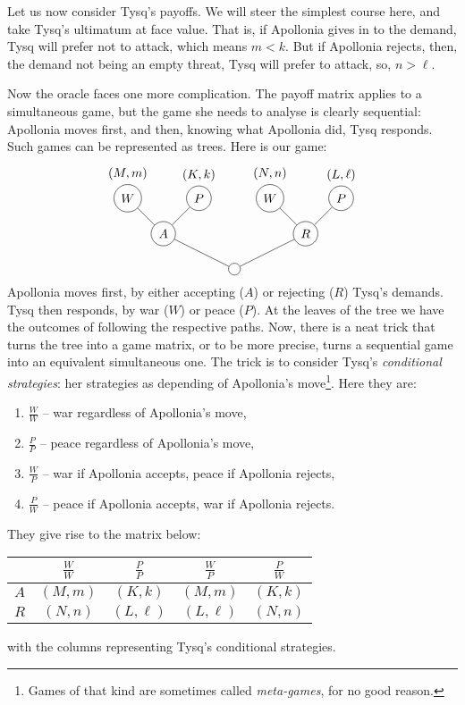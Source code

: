 \documentclass{amsart}
\begin{document}
Let us now consider Tysq's payoffs. We will steer the simplest course
here, and take Tysq's ultimatum at face value. That is, if Apollonia gives in to
the demand, Tysq will prefer not to attack, which means $m < k$. 
But if Apollonia rejects, then, the demand not being an empty threat, 
Tysq will prefer to attack, so, $n>\ell$. 

\bigskip
Now the oracle faces one more complication. The payoff matrix applies 
to a simultaneous game, but the game she needs to analyse is clearly sequential:
Apollonia moves first, and then, knowing what Apollonia did, Tysq responds. Such games
can be represented as trees. Here is our game:
$$
\begin{tikzpicture}
\path node (v0) at (0,0) [circle,draw] {} 
node (v1) at (-2,1) [circle,draw] {$A$} 
node (v2) at (-3,2) [circle,draw,label=above:{$(M,m)$}] {$W$} 
node (v3) at (-1,2) [circle,draw,label=above:{$(K,k)$}] {$P$} 
node (v4) at (1,2) [circle,draw,label=above:{$(N,n)$}] {$W$} 
node (v5) at (3,2) [circle,draw,label=above:{$(L,\ell)$}] {$P$} 
node (v6) at (2,1) [circle,draw] {$R$};
\draw (v0) -- (v1) -- (v2);
\draw (v1) -- (v3);
\draw (v0) -- (v6) -- (v5);
\draw (v6) -- (v4);
\end{tikzpicture}
$$
Apollonia moves first, by either accepting ($A$) or rejecting ($R$) Tysq's
demands. Tysq then responds, by war ($W$) or peace ($P$). At the leaves of the
tree we have the outcomes of following the respective paths. Now, there is 
a neat trick that turns the tree into a game matrix, or to be more precise, 
turns a sequential game into an equivalent simultaneous one. The trick is to
consider Tysq's \emph{conditional strategies}: her strategies as depending of
Apollonia's move\footnote{Games of that kind are sometimes called \emph{meta-games}, for
no good reason.}. Here they are:
\begin{enumerate}
\item $\frac{W}{W}$ -- war regardless of Apollonia's move,
\item $\frac{P}{P}$ -- peace regardless of Apollonia's move,
\item $\frac{W}{P}$ -- war if Apollonia accepts, peace if Apollonia rejects,
\item $\frac{P}{W}$ -- peace if Apollonia accepts, war if Apollonia rejects.
\end{enumerate}
They give rise to the matrix below:
\begin{center}
\begin{tabular}{c|cccc}
  & $\frac{W}{W}$ & $\frac{P}{P}$ & $\frac{W}{P}$ & $\frac{P}{W}$ \\
\hline
$A$ & $(M,m)$     & $(K,k)$       & $(M,m)$       & $(K,k)$  \\
$R$ & $(N,n)$     & $(L,\ell)$    & $(L,\ell)$    & $(N,n)$  
\end{tabular}
\end{center}
with the columns representing Tysq's conditional strategies. 
\end{document}
